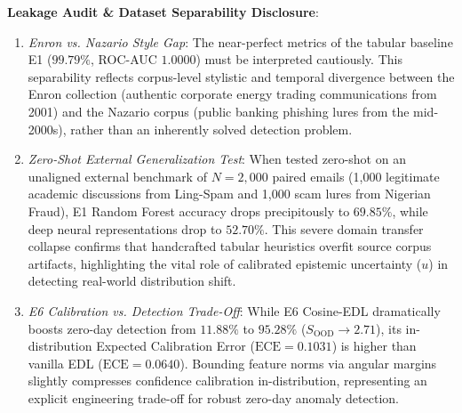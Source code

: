\documentclass[conference]{IEEEtran}
\begin{document}
\noindent\textbf{Leakage Audit \& Dataset Separability Disclosure}:
\begin{enumerate}
    \item \textit{Enron vs. Nazario Style Gap}: The near-perfect metrics of the tabular baseline E1 ($99.79\%$, ROC-AUC $1.0000$) must be interpreted cautiously. This separability reflects corpus-level stylistic and temporal divergence between the Enron collection (authentic corporate energy trading communications from 2001) and the Nazario corpus (public banking phishing lures from the mid-2000s), rather than an inherently solved detection problem.
    \item \textit{Zero-Shot External Generalization Test}: When tested zero-shot on an unaligned external benchmark of $N=2,000$ paired emails (1,000 legitimate academic discussions from Ling-Spam and 1,000 scam lures from Nigerian Fraud), E1 Random Forest accuracy drops precipitously to \textbf{$69.85\%$}, while deep neural representations drop to \textbf{$52.70\%$}. This severe domain transfer collapse confirms that handcrafted tabular heuristics overfit source corpus artifacts, highlighting the vital role of calibrated epistemic uncertainty ($u$) in detecting real-world distribution shift.
    \item \textit{E6 Calibration vs. Detection Trade-Off}: While E6 Cosine-EDL dramatically boosts zero-day detection from $11.88\%$ to $95.28\%$ ($S_{\text{OOD}} \to 2.71$), its in-distribution Expected Calibration Error ($\text{ECE} = 0.1031$) is higher than vanilla EDL ($\text{ECE} = 0.0640$). Bounding feature norms via angular margins slightly compresses confidence calibration in-distribution, representing an explicit engineering trade-off for robust zero-day anomaly detection.
\end{enumerate}
\end{document}
